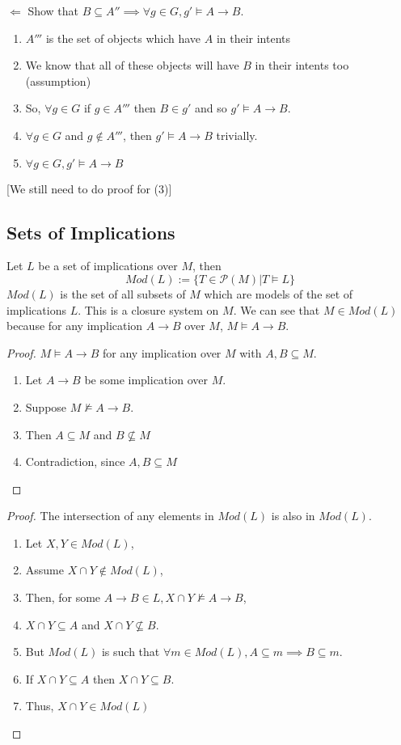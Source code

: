 $\Leftarrow$ Show that $B \subseteq A'' \implies \forall g \in G, g' \models A \rightarrow B$. 
\begin{enumerate}
    \item $A'''$ is the set of objects which have $A$ in their intents
    \item We know that all of these objects will have $B$ in their intents too (assumption)
    \item So, $\forall g \in G$ if $g\in A'''$ then $B \in g'$ and so $g' \models A \rightarrow B$. 
    \item $\forall g \in G$ and $g \not \in A'''$, then $g' \models A \rightarrow B$ trivially. 
    \item $\forall g \in G, g' \models A \rightarrow B$
\end{enumerate}

[We still need to do proof for (3)] 
\clearpage

\subsection{Sets of Implications}
Let $L$ be a set of implications over $M$, then 
\[Mod(L) := \{T \in \mathcal{P}(M) | T \models L\}\]
$Mod(L)$ is the set of all subsets of $M$ which are models of the set of implications $L$. This is a closure system on $M$. We can see that $M \in Mod(L)$ because for any implication $A \rightarrow B$ over $M$, $M \models A\rightarrow B$. 
\begin{proof}
    $M \models A\rightarrow B$ for any implication over $M$ with $A, B \subseteq M$. 
    \begin{enumerate}
        \item Let $A\rightarrow B$ be some implication over $M$. 
        \item Suppose $M \not \models A \rightarrow B$. 
        \item Then $A \subseteq M$ and $B \not \subseteq M$ 
        \item Contradiction, since $A, B \subseteq M$
    \end{enumerate}
\end{proof}
\begin{proof}
    The intersection of any elements in $Mod(L)$ is also in $Mod(L)$. 
    \begin{enumerate}
        \item Let $X, Y \in Mod(L)$, 
        \item Assume $X \cap Y \not \in Mod(L)$, 
        \item Then, for some $A\rightarrow B \in L, X \cap Y \not \models A \rightarrow B$, 
        \item $X \cap Y \subseteq A$ and $X \cap Y \not \subseteq B$. 
        \item But $Mod(L)$ is such that $\forall m \in Mod(L), A \subseteq m \implies B \subseteq m$. 
        \item If $X \cap Y \subseteq A$ then $X \cap Y \subseteq B$. 
        \item Thus, $X \cap Y \in Mod(L)$
    \end{enumerate}
\end{proof}

